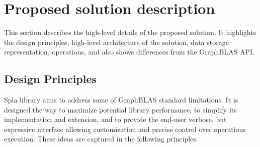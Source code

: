\section{Proposed solution description}

This section describes the high-level details of the proposed solution. 
It highlights the design principles, high-level architecture of the solution, data storage representation, operations, and also shows differences from the GraphBLAS API.

\subsection{Design Principles}

Spla library aims to address some of GraphBLAS standard limitations.
It is designed the way to maximize potential library performance, to simplify its implementation and extension, and to provide the end-user verbose, but expressive interface allowing customization and precise control over operations execution. 
These ideas are captured in the following principles.

